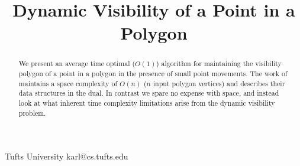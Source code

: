 \documentclass[10pt,preprint]{sigplanconf}
\begin{document}
\setlength{\pdfpageheight}{\paperheight}
\setlength{\pdfpagewidth}{\paperwidth}






\title{Dynamic Visibility of a Point in a Polygon}


           {Tufts University}
           {karl@cs.tufts.edu}


\maketitle

\begin{abstract}
We present an average time optimal ($O(1)$) algorithm for maintaining
the visibility polygon of a point in a polygon in the presence of
small point movements.
The work of \cite{dynamic-visibility} maintains a space complexity
of $O(n)$ ($n$ input polygon vertices) and describes their data
structures in the dual. In contrast we spare no expense with space,
and instead look at what inherent time complexity limitations arise
from the dynamic visibility problem.
\end{abstract}
\end{document}
